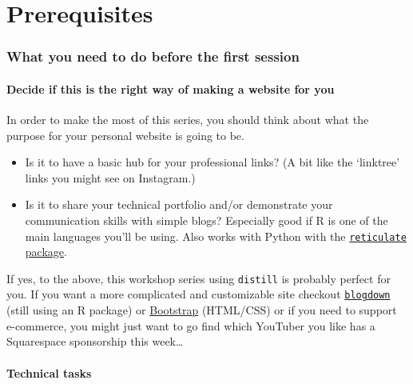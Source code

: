 \documentclass[
]{article}
\providecommand{\tightlist}{%
  \setlength{\itemsep}{0pt}\setlength{\parskip}{0pt}}
\begin{document}
\hypertarget{part-prerequisites}{%
\part{Prerequisites}\label{part-prerequisites}}

\hypertarget{prereqs}{%
\section{What you need to do before the first session}\label{prereqs}}

\hypertarget{decide-if-this-is-the-right-way-of-making-a-website-for-you}{%
\subsection{Decide if this is the right way of making a website for you}\label{decide-if-this-is-the-right-way-of-making-a-website-for-you}}

In order to make the most of this series, you should think about what the purpose for your personal website is going to be.

\begin{itemize}
\tightlist
\item
  Is it to have a basic hub for your professional links? (A bit like the `linktree' links you might see on Instagram.)
\item
  Is it to share your technical portfolio and/or demonstrate your communication skills with simple blogs? Especially good if R is one of the main languages you'll be using. Also works with Python with the \href{https://rstudio.github.io/reticulate/}{\texttt{reticulate} package}.
\end{itemize}

If yes, to the above, this workshop series using \texttt{distill} is probably perfect for you. If you want a more complicated and customizable site checkout \href{https://bookdown.org/yihui/blogdown/}{\texttt{blogdown}} (still using an R package) or \href{https://www.w3schools.com/howto/howto_website_bootstrap.asp}{Bootstrap} (HTML/CSS) or if you need to support e-commerce, you might just want to go find which YouTuber you like has a Squarespace sponsorship this week\ldots{}

\hypertarget{technical-tasks}{%
\subsection{Technical tasks}\label{technical-tasks}}
\end{document}

